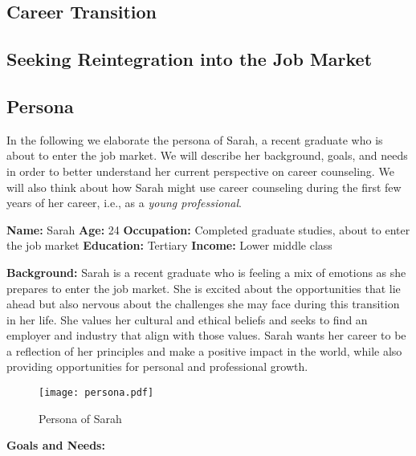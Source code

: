 \subsection{Career Transition}

\subsection{Seeking Reintegration into the Job Market}

\subsection{Persona}

In the following we elaborate the persona of Sarah, a recent graduate who is about to enter the job market. We will
describe her background, goals, and needs in order to better understand her current perspective on career counseling.
We will also think about how Sarah might use career counseling during the first few years of her career, i.e., as
a \textit{young professional}.
\newline

\noindent \textbf{Name:} Sarah
\newline\noindent\textbf{Age:} 24
\newline\noindent\textbf{Occupation:} Completed graduate studies, about to enter the job market
\newline\noindent\textbf{Education:} Tertiary
\newline\noindent\textbf{Income:} Lower middle class

\noindent\textbf{Background:} Sarah is a recent graduate who is feeling a mix of emotions as she prepares to enter the job market.
She is excited about the opportunities that lie ahead but also nervous about the challenges she may face during this transition in
her life. She values her cultural and ethical beliefs and seeks to find an employer and industry that align with those values. Sarah
wants her career to be a reflection of her principles and make a positive impact in the world, while also providing opportunities for
personal and professional growth.

\begin{figure}[h!]
    \centering
    \caption{Persona of Sarah}
    \label{fig:persona}
    \texttt{[image: persona.pdf]}
\end{figure}

\noindent\textbf{Goals and Needs:}

